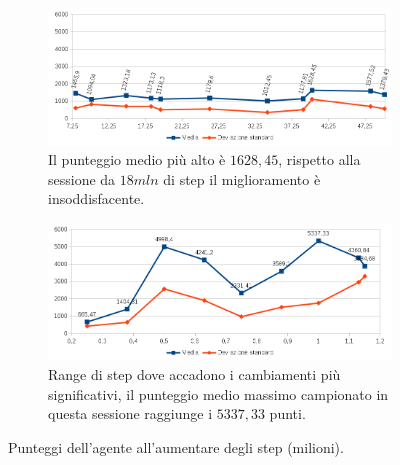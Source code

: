 \documentclass[twoside,twocolumn,10pt]{extarticle}
\theoremstyle{definition}
\begin{document}
			\begin{figure}[h]
				\centering
				
				\begin{subfigure}[b]{\textwidth}
					\centering
					\includegraphics[scale=.75]{images/over7.png}
					\caption{Il punteggio medio più alto è $1628,45$, rispetto alla sessione da $18mln$ di step il miglioramento è insoddisfacente.}
					\label{subfig:under7}
				\end{subfigure}
				
				\begin{subfigure}[b]{\textwidth}
					\centering
					\includegraphics[scale=.75]{images/under7.png}
					\caption{Range di step dove accadono i cambiamenti più significativi, il punteggio medio massimo campionato in questa sessione raggiunge i $5337,33$ punti.}
					\label{subfig:over7}
				\end{subfigure}
			
				\caption{Punteggi dell'agente all'aumentare degli step (milioni).} 
				\label{fig:centipede-scores}
			\end{figure}
		
\end{document}

